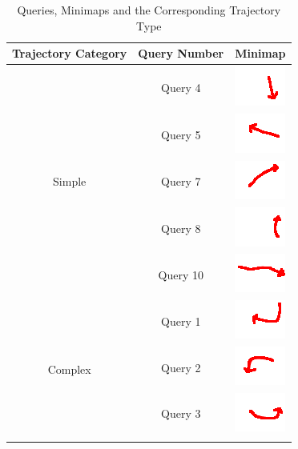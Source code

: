 \begin{table}[!tb] \centering
\caption{Queries, Minimaps and the Corresponding Trajectory Type}
\begin{tabular}{|c|c|c|}
\hline
\multicolumn{1}{|c|}{\textbf{Trajectory Category}} & \textbf{Query Number} & \textbf{Minimap}\\ \hline
\multirow{5}{*}{Simple} & Query 4 & \includegraphics{image/minimaps/query_04.png} \\ \cline{2-3}
 & Query 5 & \includegraphics{image/minimaps/query_05.png} \\ \cline{2-3}
 & Query 7 & \includegraphics{image/minimaps/query_07.png} \\ \cline{2-3}
 & Query 8 & \includegraphics{image/minimaps/query_08.png} \\ \cline{2-3}
 & Query 10 & \includegraphics{image/minimaps/query_10.png} \\ \hline
\multirow{6}{*}{Complex} & Query 1 & \includegraphics{image/minimaps/query_01.png} \\ \cline{2-3}
 & Query 2 & \includegraphics{image/minimaps/query_02.png} \\ \cline{2-3}
 & Query 3 & \includegraphics{image/minimaps/query_03.png} \\ \cline{2-3}

\end{tabular}
\end{table}
